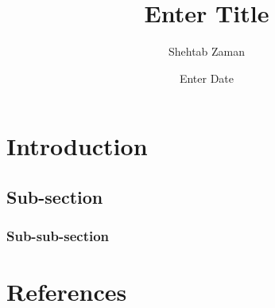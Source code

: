 \documentclass{article}
\title{Enter Title}
\author{Shehtab Zaman}
\date{Enter Date}
\begin{document}
  \maketitle
  \section{Introduction}
  \subsection{Sub-section}
  \subsubsection{Sub-sub-section}
  \section{References}
\end{document}
